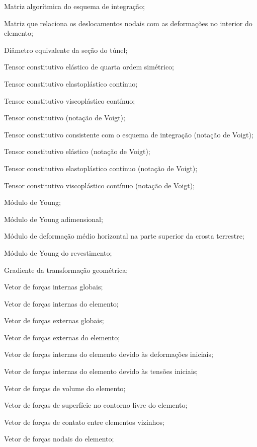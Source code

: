 \item[\textbf{Latino maiúsculo:}]
\item[$\All$]	Matriz algorítmica do esquema de integração;
\item[$\Bll$]	Matriz que relaciona os deslocamentos nodais com as deformações no interior do elemento;
\item[$D$]				Diâmetro equivalente da seção do túnel;
\item[$\Dllll$] Tensor constitutivo elástico de quarta ordem simétrico;
\item[$\Dllll^{ep}$] Tensor constitutivo elastoplástico contínuo;
\item[$\Dllll^{vp}$] Tensor constitutivo viscoplástico contínuo;
\item[$\Dll$] Tensor constitutivo (notação de Voigt);
\item[$\Dll^{alg}$] Tensor constitutivo consistente com o esquema de integração (notação de Voigt);
\item[$\Dll^{e}$] Tensor constitutivo elástico (notação de Voigt);
\item[$\Dll^{ep}$] Tensor constitutivo elastoplástico contínuo (notação de Voigt);
\item[$\Dll^{vp}$] Tensor constitutivo viscoplástico contínuo (notação de Voigt);
\item[$E$]				Módulo de Young;
\item[$E^*$]			Módulo de Young adimensional;
\item[$E_h$]			Módulo de deformação médio horizontal na parte superior da crosta terrestre;
\item[$E_{rev}$]			Módulo de Young do revestimento;
\item[$\Fll$]			Gradiente da transformação geométrica;
\item[$\Fl_{int}$]			Vetor de forças internas globais;
\item[$\Fl_{int_e}$]			Vetor de forças internas do elemento;
\item[$\Fl_{ext}$]			Vetor de forças externas globais;
\item[$\Fl_{ext_e}$]			Vetor de forças externas do elemento;
\item[$\Fl_{\varepsilon_{0_e}}$]	Vetor de forças internas do elemento devido às deformações iniciais;
\item[$\Fl_{\sigma_{0_e}}$]	Vetor de forças internas do elemento devido às tensões iniciais;
\item[$\Fl_{V_e}$]	Vetor de forças de volume do elemento;
\item[$\Fl_{S_e}$]	Vetor de forças de superfície no contorno livre do elemento;
\item[$\Fl_{C_e}$]	Vetor de forças de contato entre elementos vizinhos;
\item[$\Fl_{N_e}$]	Vetor de forças nodais do elemento;

